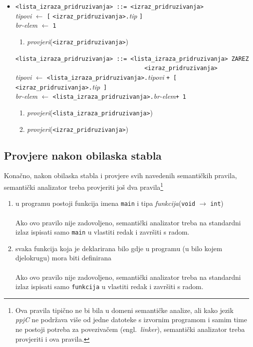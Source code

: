 \documentclass[times, 12pt, utf8]{book}
\begin{document}
\begin{itemize}

\item
\verb|<lista_izraza_pridruzivanja> ::= <izraz_pridruzivanja>|\\
\emph{tipovi} \(\leftarrow\) \verb|[| \verb|<izraz_pridruzivanja>.|\emph{tip} \verb|]|\\
\emph{br-elem} \(\leftarrow\) \verb|1|
\begin{enumerate}
\item
\emph{provjeri}(\verb|<izraz_pridruzivanja>|)
\end{enumerate}

\verb|<lista_izraza_pridruzivanja> ::= <lista_izraza_pridruzivanja> ZAREZ|\\
\verb|                                     <izraz_pridruzivanja>|\\
\emph{tipovi} \(\leftarrow\) \verb|<lista_izraza_pridruzivanja>.|\emph{tipovi} \verb|+ [| \verb|<izraz_pridruzivanja>.|\emph{tip}\verb| ]|\\
\emph{br-elem} \(\leftarrow\) \verb|<lista_izraza_pridruzivanja>.|\emph{br-elem}\verb|+ 1|
\begin{enumerate}
\item
\emph{provjeri}(\verb|<lista_izraza_pridruzivanja>|)
\item
\emph{provjeri}(\verb|<izraz_pridruzivanja>|)
\end{enumerate}

\end{itemize}

\subsection{Provjere nakon obilaska stabla}\label{sec:semantika_after}
Konačno, nakon obilaska stabla i provjere svih navedenih semantičkih pravila, semantički analizator treba provjeriti još dva pravila\footnote{Ova pravila tipično ne bi bila u domeni semantičke analize, ali kako jezik \emph{ppjC} ne podržava više od jedne datoteke s izvornim programom i samim time ne postoji potreba za povezivačem (engl.~\emph{linker}), semantički analizator treba provjeriti i ova pravila.}

\begin{enumerate}
\item
u programu postoji funkcija imena \verb|main| i tipa \emph{funkcija}(\verb|void| \(\to\) \verb|int|)\\\\
Ako ovo pravilo nije zadovoljeno, semantički analizator treba na standardni izlaz ispisati samo \verb|main| u vlastiti redak i završiti s radom.
\item
svaka funkcija koja je deklarirana bilo gdje u programu (u bilo kojem djelokrugu) mora biti definirana\\\\
Ako ovo pravilo nije zadovoljeno, semantički analizator treba na standardni izlaz ispisati samo \verb|funkcija| u vlastiti redak i završiti s radom.
\end{enumerate}
\end{document}
